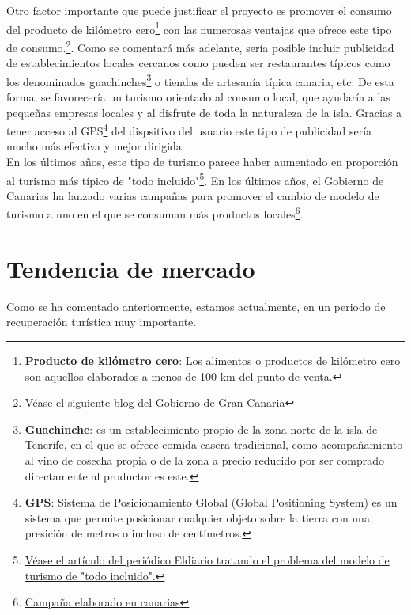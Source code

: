 \documentclass{report}
\begin{document}
Otro factor importante que puede justificar el proyecto es promover el consumo del producto de kilómetro cero\footnote{\textbf{Producto de kilómetro cero}: Los alimentos o productos de kilómetro cero son aquellos elaborados a menos de 100 km del punto de venta.} con las numerosas ventajas que ofrece este tipo de consumo.\footnote{ \href{https://grancanariamegusta.com/blog/productos-km-0-tendencia-y-concienciacion-n5}{Véase el siguiente blog del Gobierno de Gran Canaria}}. Como se comentará más adelante, sería posible incluir publicidad de establecimientos locales cercanos como pueden ser restaurantes típicos como los denominados guachinches\footnote{\textbf{Guachinche}: es un establecimiento propio de la zona norte de la isla de Tenerife, en el que se ofrece comida casera tradicional, como acompañamiento al vino de cosecha propia o de la zona a precio reducido por ser comprado directamente al productor es este.} o tiendas de artesanía típica canaria, etc. De esta forma, se favorecería un turismo orientado al consumo local, que ayudaría a las pequeñas empresas locales y al disfrute de toda la naturaleza de la isla. Gracias a tener acceso al GPS\footnote{\textbf{GPS}: Sistema de Posicionamiento Global (Global Positioning System) es un sistema que permite posicionar cualquier objeto sobre la tierra con una presición de metros o incluso de centímetros.} del dispsitivo del usuario este tipo de publicidad sería mucho más efectiva y mejor dirigida.\\

En los últimos años, este tipo de turismo parece haber aumentado en proporción al turismo más típico de "todo incluido"\footnote{\href{https://www.eldiario.es/canariasahora/turismo/canarias-no-quiere-destino-exclusivo-incluido-busca-nuevo-modelo-turistico-economia-circular_1_8164841.html}{Véase el artículo del periódico Eldiario tratando el problema del modelo de turismo de "todo incluido".}}. En los últimos años, el Gobierno de Canarias ha lanzado varias campañas para promover el cambio de modelo de turismo a uno en el que se consuman más productos locales\footnote{\href{https://rtvc.es/elaborado-en-canarias-fomenta-el-consumo-del-producto-local-en-jovenes/}{Campaña elaborado en canarias}}.

\section{Tendencia de mercado}
Como se ha comentado anteriormente, estamos actualmente, en un periodo de recuperación turística muy importante. 
\end{document}
